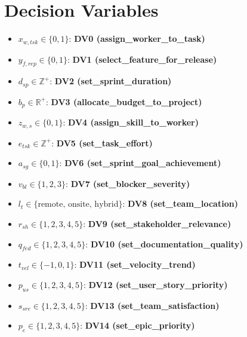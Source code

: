 \documentclass{article}
\begin{document}
\section{Decision Variables}
\begin{itemize}
    \item $x_{w,tsk} \in \{0,1\}$: \textbf{DV0 (assign\_worker\_to\_task)}
    \item $y_{f,rep} \in \{0,1\}$: \textbf{DV1 (select\_feature\_for\_release)}
    \item $d_{sp} \in \mathbb{Z}^+$: \textbf{DV2 (set\_sprint\_duration)}
    \item $b_p \in \mathbb{R}^+$: \textbf{DV3 (allocate\_budget\_to\_project)}
    \item $z_{w,s} \in \{0,1\}$: \textbf{DV4 (assign\_skill\_to\_worker)}
    \item $e_{tsk} \in \mathbb{Z}^+$: \textbf{DV5 (set\_task\_effort)}
    \item $a_{sg} \in \{0,1\}$: \textbf{DV6 (set\_sprint\_goal\_achievement)}
    \item $v_{bl} \in \{1,2,3\}$: \textbf{DV7 (set\_blocker\_severity)}
    \item $l_t \in \{\text{remote, onsite, hybrid}\}$: \textbf{DV8 (set\_team\_location)}
    \item $r_{sh} \in \{1,2,3,4,5\}$: \textbf{DV9 (set\_stakeholder\_relevance)}
    \item $q_{fed} \in \{1,2,3,4,5\}$: \textbf{DV10 (set\_documentation\_quality)}
    \item $t_{vel} \in \{-1,0,1\}$: \textbf{DV11 (set\_velocity\_trend)}
    \item $p_{us} \in \{1,2,3,4,5\}$: \textbf{DV12 (set\_user\_story\_priority)}
    \item $s_{sre} \in \{1,2,3,4,5\}$: \textbf{DV13 (set\_team\_satisfaction)}
    \item $p_e \in \{1,2,3,4,5\}$: \textbf{DV14 (set\_epic\_priority)}
\end{itemize}
\end{document}
